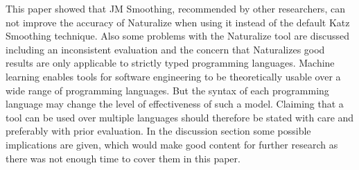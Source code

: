 This paper showed that JM Smoothing, recommended by other researchers, can not improve the accuracy of Naturalize when using it instead of the default Katz Smoothing technique. Also some problems with the Naturalize tool are discussed including an inconsistent evaluation and the concern that Naturalizes good results are only applicable to strictly typed programming languages. Machine learning enables tools for software engineering to be theoretically usable over a wide range of programming languages. But the syntax of each programming language may change the level of effectiveness of such a model. Claiming that a tool can be used over multiple languages should therefore be stated with care and preferably with prior evaluation. In the discussion section some possible implications are given, which would make good content for further research as there was not enough time to cover them in this paper.